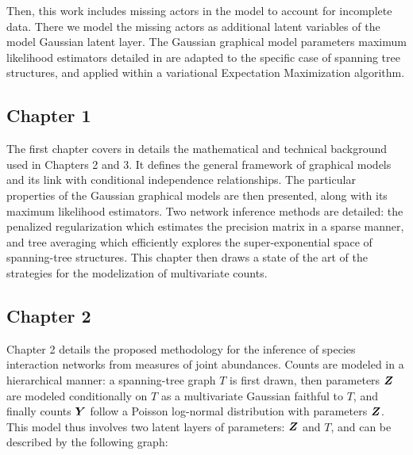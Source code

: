 Then, this work includes missing actors in the model to account for incomplete data. There we model the missing actors as additional latent variables of the model Gaussian latent layer. The Gaussian graphical model parameters maximum likelihood estimators detailed in \citet{Lau96} are adapted to the specific case of spanning tree structures, and applied within a variational Expectation Maximization algorithm.

  \subsection*{Chapter 1}
The first chapter covers in details the mathematical and technical background used in Chapters 2 and 3. It defines the general framework of graphical models and its link with conditional independence relationships. The particular properties of the Gaussian graphical models are then presented, along with its maximum likelihood estimators. Two network inference methods are detailed: the penalized regularization which estimates the precision matrix in a sparse manner, and tree averaging which efficiently explores the super-exponential space of spanning-tree structures. This chapter then draws a state of the art of the strategies for the modelization of multivariate counts.

   \subsection*{Chapter 2}
   Chapter 2 details the proposed methodology for the inference of species interaction networks from measures of joint abundances. Counts are modeled in a hierarchical manner: a spanning-tree graph $T$ is first drawn, then parameters ${\boldsymbol{Z}}$ are modeled  conditionally on $T$ as a multivariate Gaussian faithful to $T$, and finally counts ${\boldsymbol{Y}}$ follow a Poisson log-normal distribution with parameters ${\boldsymbol{Z}}$. This model thus involves two latent layers of parameters: ${\boldsymbol{Z}}$ and $T$, and can be described by the following graph:
 
 \begin{center}
   \end{center}
 
